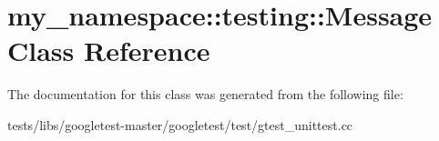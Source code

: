 \hypertarget{classmy__namespace_1_1testing_1_1Message}{}\section{my\+\_\+namespace\+:\+:testing\+:\+:Message Class Reference}
\label{classmy__namespace_1_1testing_1_1Message}


The documentation for this class was generated from the following file\+:\begin{DoxyCompactItemize}
\item 
tests/libs/googletest-\/master/googletest/test/gtest\+\_\+unittest.\+cc\end{DoxyCompactItemize}
